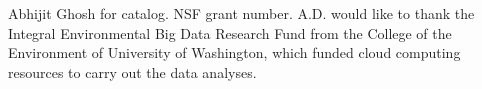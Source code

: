 \documentclass[draft]{agujournal2019}
\begin{document}
%
%
%
%
%
%
%
%


\acknowledgments
Abhijit Ghosh for catalog. NSF grant number. A.D. would like to thank the Integral Environmental Big Data Research Fund from the College of the Environment of University of Washington, which funded cloud computing resources to carry out the data analyses.



%
%





%
%
%
%
%
\end{document}
